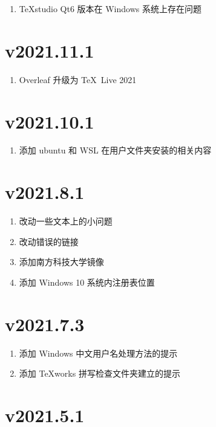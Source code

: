\begin{enumerate}
  \item \TeX studio Qt6 版本在 Windows 系统上存在问题
\end{enumerate}

\section*{v2021.11.1}

\begin{enumerate}
  \item Overleaf 升级为 \TeX\ Live 2021
\end{enumerate}

\section*{v2021.10.1}

\begin{enumerate}
  \item 添加 ubuntu 和 WSL 在用户文件夹安装的相关内容
\end{enumerate}

\section*{v2021.8.1}

\begin{enumerate}
  \item 改动一些文本上的小问题
  \item 改动错误的链接
  \item 添加南方科技大学镜像
  \item 添加 Windows 10 系统内注册表位置
\end{enumerate}

\section*{v2021.7.3}

\begin{enumerate}
  \item 添加 Windows 中文用户名处理方法的提示
  \item 添加 \TeX works 拼写检查文件夹建立的提示
\end{enumerate}

\section*{v2021.5.1}

